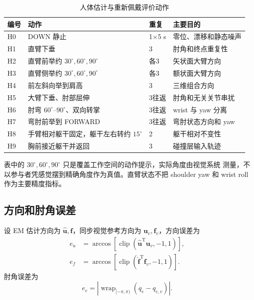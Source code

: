 \begin{table}[htbp]
  \centering
  \caption{人体估计与重新佩戴评价动作}
  \label{tab:ch6_human_actions}
  \begin{tabularx}{\linewidth}{@{}lXlX@{}}
    \toprule
    编号 & 动作 & 重复 & 主要目的 \\
    \midrule
    H0 & DOWN 静止 & 1$\times$5 s & 零位、漂移和静态噪声 \\
    H1 & 直臂下垂 & 3 & 肘角和终点重复性 \\
    H2 & 直臂前举约 $30^\circ,60^\circ,90^\circ$ & 各3 & 矢状面大臂方向 \\
    H3 & 直臂侧举约 $30^\circ,60^\circ,90^\circ$ & 各3 & 额状面大臂方向 \\
    H4 & 前左斜向举到肩高 & 3 & 三维组合方向 \\
    H5 & 大臂下垂、肘部屈伸 & 3往返 & 肘角和无关关节串扰 \\
    H6 & 肘弯 $60^\circ$--$90^\circ$、双向转掌 & 3往返 & wrist 与 yaw 分离 \\
    H7 & 弯肘前举到 FORWARD & 3往返 & 弯肘状态方向和 yaw \\
    H8 & 手臂相对躯干固定，躯干左右转约 $15^\circ$ & 2 & 躯干相对不变性 \\
    H9 & 胸前接近躯干并返回 & 3 & 碰撞层输入轨迹 \\
    \bottomrule
  \end{tabularx}
\end{table}

表中的 $30^\circ,60^\circ,90^\circ$ 只是覆盖工作空间的动作提示，实际角度由视觉系统
测量，不以参与者凭感觉摆到精确角度作为真值。直臂状态不把 shoulder yaw 和 wrist roll
作为主要精度指标。

\subsection{方向和肘角误差}
\label{subsec:ch6_direction_elbow_errors}

设 EM 估计方向为 $\hat{\boldsymbol u},\hat{\boldsymbol f}$，同步视觉参考方向为
$\boldsymbol u_v,\boldsymbol f_v$，方向误差为
\begin{align}
  e_u&=\arccos\left[
  \operatorname{clip}\left(
  \hat{\boldsymbol u}^{\mathrm T}\boldsymbol u_v,-1,1\right)\right],
  \label{eq:ch6_upper_direction_error}\\
  e_f&=\arccos\left[
  \operatorname{clip}\left(
  \hat{\boldsymbol f}^{\mathrm T}\boldsymbol f_v,-1,1\right)\right].
  \label{eq:ch6_forearm_direction_error}
\end{align}
肘角误差为
\begin{equation}
  e_e=\left|
  \operatorname{wrap}_{[-\pi,\pi)}
  \left(q_e-q_{e,v}\right)\right|.
  \label{eq:ch6_elbow_error}
\end{equation}

